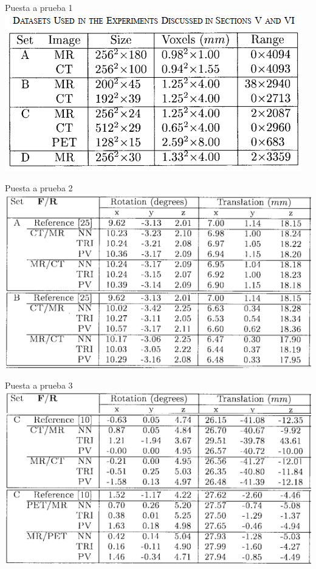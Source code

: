 \documentclass[14pt,xcolor={rgb}]{beamer}
\begin{document}
\begin{frame}{Puesta a prueba 1}
\includegraphics[scale=.80]{Images/dataset.png}
\end{frame}

\begin{frame}{Puesta a prueba 2}
\includegraphics[scale=.75]{Images/resultados(1).png}
\end{frame}

\begin{frame}{Puesta a prueba 3}
\includegraphics[scale=.75]{Images/resultados(2).png}
\end{frame}
\end{document}
